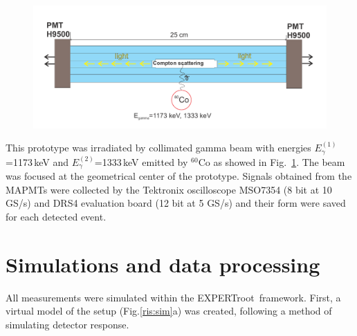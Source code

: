 \documentclass{webofc}
\newcommand{\er}{\textmd{EXPERTroot}}
\begin{document}
\begin{figure}[h]
	\centering
	\includegraphics[width=0.8\linewidth]{NeuRadexperiment.png}
	\label{ris:neuradexp}
\end{figure}

This prototype was irradiated by collimated gamma beam with energies $E^{(1)}_{\gamma}$=1173\,keV and $E^{(2)}_{\gamma}$=1333\,keV emitted by $^{60}$Co as showed in Fig.~\ref{ris:neuradexp}. The beam was focused at the geometrical center of the prototype. Signals obtained from the MAPMTs were collected by the Tektronix oscilloscope MSO7354 (8 bit at 10 GS/s) and DRS4 evaluation board (12 bit at 5 GS/s) and their form were saved for each detected event.

\section{Simulations and data processing}

All measurements were simulated within the \er\, framework. First, a virtual model of the setup (Fig.\ref{ris:sim}a) was created, following a method of simulating detector response. 


	
\end{document}
